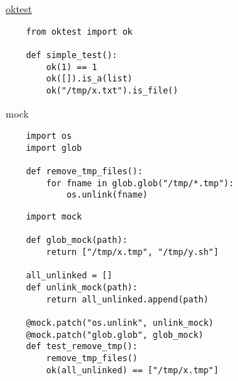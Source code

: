 \documentclass{article}
\begin{document}
\begin{center} \href{http://www.kuwata-lab.com/oktest/oktest-py_users-guide.html}{oktest} \end{center}
\begin{lstlisting}
	from oktest import ok

	def simple_test():
		ok(1) == 1
		ok([]).is_a(list)
		ok("/tmp/x.txt").is_file()
\end{lstlisting}
\newpage

\begin{center} mock \end{center}
\begin{lstlisting}
	import os
	import glob

	def remove_tmp_files():
		for fname in glob.glob("/tmp/*.tmp"):
			os.unlink(fname)
\end{lstlisting}
\newpage

\begin{center}\end{center}
\begin{lstlisting}
	import mock

	def glob_mock(path):
		return ["/tmp/x.tmp", "/tmp/y.sh"]

	all_unlinked = []
	def unlink_mock(path):
		return all_unlinked.append(path)

	@mock.patch("os.unlink", unlink_mock)
	@mock.patch("glob.glob", glob_mock)
	def test_remove_tmp():
		remove_tmp_files()
		ok(all_unlinked) == ["/tmp/x.tmp"]
\end{lstlisting}
\newpage
\end{document}
